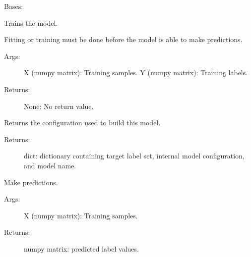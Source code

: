 \documentclass[letterpaper,10pt,english]{sphinxmanual}
\begin{document}
\begin{fulllineitems}
\label{\detokenize{KUHERD:KUHERD.Models.ClassificationModel}}
Bases: 

\begin{fulllineitems}
\label{\detokenize{KUHERD:KUHERD.Models.ClassificationModel.fit}}
Trains the model.

Fitting or \sphinxquotedblleft{}training\sphinxquotedblright{} must be done before the model is able to make predictions.
\begin{description}
\item[{Args:}] \leavevmode
X (numpy matrix): Training samples.
Y (numpy matrix): Training labels.

\item[{Returns:}] \leavevmode
None: No return value.

\end{description}

\end{fulllineitems}


\begin{fulllineitems}
\label{\detokenize{KUHERD:KUHERD.Models.ClassificationModel.get_config}}
Returns the configuration used to build this model.
\begin{description}
\item[{Returns:}] \leavevmode
dict: dictionary containing target label set, internal model configuration, and model name.

\end{description}

\end{fulllineitems}


\begin{fulllineitems}
\label{\detokenize{KUHERD:KUHERD.Models.ClassificationModel.predict}}
Make predictions.
\begin{description}
\item[{Args:}] \leavevmode
X (numpy matrix): Training samples.

\item[{Returns:}] \leavevmode
numpy matrix: predicted label values.

\end{description}

\end{fulllineitems}


\end{fulllineitems}
\end{document}
